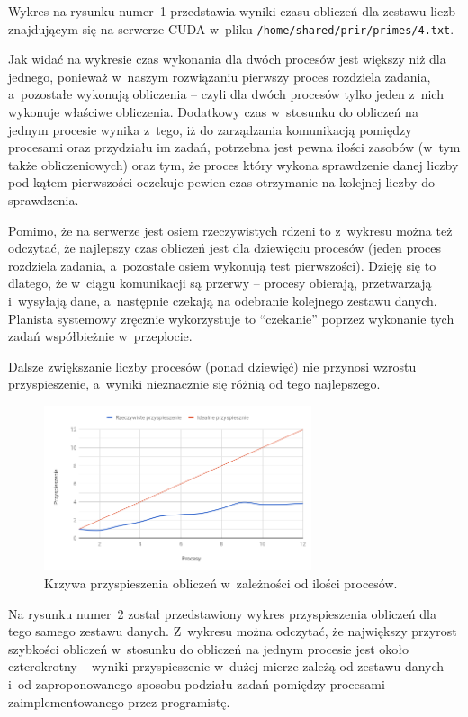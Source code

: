 \documentclass[a4paper,12pt]{article}
\begin{document}
Wykres na rysunku numer~1 przedstawia wyniki czasu obliczeń dla zestawu liczb znajdującym się na serwerze CUDA w~pliku \texttt{/home/shared/prir/primes/4.txt}.

Jak widać na wykresie czas wykonania dla dwóch procesów jest większy niż dla jednego, ponieważ w~naszym rozwiązaniu pierwszy proces rozdziela zadania, a~pozostałe wykonują obliczenia -- czyli dla dwóch procesów tylko jeden z~nich wykonuje właściwe obliczenia. Dodatkowy czas w~stosunku do obliczeń na jednym procesie wynika z~tego, iż do zarządzania komunikacją pomiędzy procesami oraz przydziału im zadań, potrzebna jest pewna ilości zasobów (w~tym także obliczeniowych) oraz tym, że proces który wykona sprawdzenie danej liczby pod kątem pierwszości oczekuje pewien czas otrzymanie na kolejnej liczby do sprawdzenia.

Pomimo, że na serwerze jest osiem rzeczywistych rdzeni to z~wykresu można też odczytać, że najlepszy czas obliczeń jest dla dziewięciu procesów (jeden proces rozdziela zadania, a~pozostałe osiem wykonują test pierwszości). Dzieję się to dlatego, że w~ciągu komunikacji są przerwy -- procesy obierają, przetwarzają i~wysyłają dane, a~następnie czekają na odebranie kolejnego zestawu danych. Planista systemowy zręcznie wykorzystuje to ``czekanie'' poprzez wykonanie tych zadań współbieżnie w~przeplocie.

Dalsze zwiększanie liczby procesów (ponad dziewięć) nie przynosi wzrostu przyspieszenie, a~wyniki nieznacznie się różnią od tego najlepszego.

\begin{figure}[!htbp]
  \centering
    \includegraphics[width=0.7\textwidth]{chart2}
    \caption{Krzywa przyspieszenia obliczeń w~zależności od ilości procesów.}
  \label{chart-acceleration}
\end{figure}
Na rysunku numer~2 został przedstawiony wykres przyspieszenia obliczeń dla tego samego zestawu danych. Z~wykresu można odczytać, że największy przyrost szybkości obliczeń w~stosunku do obliczeń na jednym procesie jest około czterokrotny -- wyniki przyspieszenie w~dużej mierze zależą od zestawu danych i~od zaproponowanego sposobu podziału zadań pomiędzy procesami zaimplementowanego przez programistę.
\end{document}
